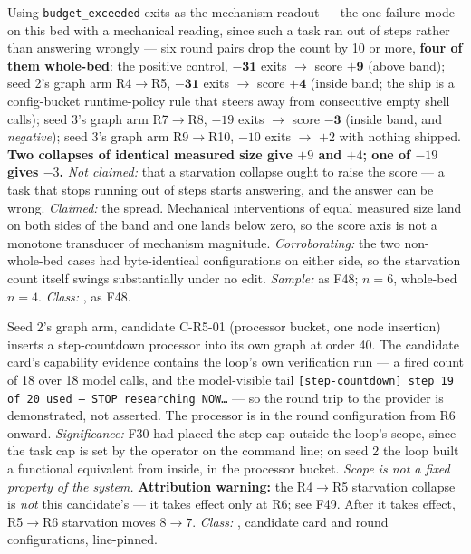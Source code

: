 \begin{description}[leftmargin=0pt,style=nextline,font=\normalfont,itemsep=6pt]
\item[\textbf{F49}\quad Mechanism magnitude and score movement are
      decoupled.]
Using \texttt{budget\_exceeded} exits as the mechanism readout --- the one
failure mode on this bed with a mechanical reading, since such a task ran
out of steps rather than answering wrongly --- six round pairs drop the
count by 10 or more, \textbf{four of them whole-bed}: the positive control,
$\mathbf{-31}$ exits $\to$ score $\mathbf{+9}$ (above band); seed 2's graph
arm R4$\to$R5, $\mathbf{-31}$ exits $\to$ score $\mathbf{+4}$ (inside band;
the ship is a config-bucket runtime-policy rule that steers away from
consecutive empty shell calls); seed 3's graph arm R7$\to$R8, $-19$ exits
$\to$ score $\mathbf{-3}$ (inside band, and \emph{negative}); seed 3's
graph arm R9$\to$R10, $-10$ exits $\to$ $+2$ with nothing shipped.
\textbf{Two collapses of identical measured size give $+9$ and $+4$; one
of $-19$ gives $-3$.} \emph{Not claimed:} that a starvation collapse ought
to raise the score --- a task that stops running out of steps starts
answering, and the answer can be wrong. \emph{Claimed:} the spread. Mechanical
interventions of equal measured size land on both sides of the band and one
lands below zero, so the score axis is not a monotone transducer of
mechanism magnitude. \emph{Corroborating:} the two non-whole-bed cases had
byte-identical configurations on either side, so the starvation count
itself swings substantially under no edit. \emph{Sample:} as F48; $n=6$,
whole-bed $n=4$. \emph{Class:} , as F48.

\item[\textbf{F50}\quad The loop builds its own step mechanism.]
Seed 2's graph arm, candidate C-R5-01 (processor bucket, one node
insertion) inserts a step-countdown processor into its own graph at order
40. The candidate card's capability evidence contains the loop's own
verification run --- a fired count of 18 over 18 model calls, and the
model-visible tail
\texttt{[step-countdown] step 19 of 20 used --- STOP researching NOW\ldots}
--- so the round trip to the provider is demonstrated, not asserted. The
processor is in the round configuration from R6 onward.
\emph{Significance:} F30 had placed the step cap outside the loop's scope,
since the task cap is set by the operator on the command line; on seed 2
the loop built a functional equivalent from inside, in the processor
bucket. \emph{Scope is not a fixed property of the system.}
\textbf{Attribution warning:} the R4$\to$R5 starvation collapse is
\emph{not} this candidate's --- it takes effect only at R6; see F49. After
it takes effect, R5$\to$R6 starvation moves $8 \to 7$.
\emph{Class:} , candidate card and round configurations, line-pinned.


\end{description}
